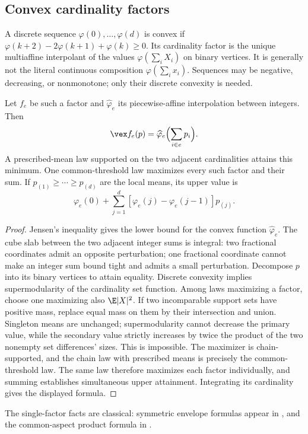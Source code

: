 \subsection{Convex cardinality factors}
A discrete sequence $\varphi(0),\ldots,\varphi(d)$ is convex if
$\varphi(k+2)-2\varphi(k+1)+\varphi(k)\ge0$. Its cardinality factor
is the unique multiaffine interpolant of the values
$\varphi(\sum_iX_i)$ on binary vertices. It is generally not the literal
continuous composition $\varphi(\sum_ix_i)$. Sequences may be negative,
decreasing, or nonmonotone; only their discrete convexity is needed.

\begin{lemma}\label{lem:cardinality-envelopes}
Let $f_e$ be such a factor and $\widehat\varphi_e$ its piecewise-affine
interpolation between integers. Then
\[
 \vex f_e(p)=\widehat\varphi_e\Bigl(\sum_{i\in e}p_i\Bigr).
\]
A prescribed-mean law supported on the two adjacent cardinalities attains
this minimum. One common-threshold law maximizes every such factor and
their sum. If $p_{(1)}\ge\cdots\ge p_{(d)}$ are the local means, its
upper value is
\[
 \varphi_e(0)+\sum_{j=1}^d[\varphi_e(j)-\varphi_e(j-1)]p_{(j)}.
\]
\end{lemma}
\begin{proof}
Jensen's inequality gives the lower bound for the convex function
$\widehat\varphi_e$. The cube slab between the two adjacent integer
sums is integral: two fractional coordinates admit an opposite
perturbation; one fractional coordinate cannot make an integer sum
bound tight and admits a small perturbation. Decompose $p$ into its
binary vertices to attain equality.
Discrete convexity implies supermodularity of the cardinality set
function. Among laws maximizing a factor, choose one maximizing also
$\E|X|^2$. If two incomparable support sets have positive mass, replace
equal mass on them by their intersection and union. Singleton means
are unchanged; supermodularity cannot decrease the primary value,
while the secondary value strictly increases by twice the product of
the two nonempty set differences' sizes. This is impossible. The
maximizer is chain-supported, and the chain law with prescribed means
is precisely the common-threshold law. The same law therefore maximizes
each factor individually, and summing establishes simultaneous upper
attainment. Integrating its cardinality gives the displayed formula.
\end{proof}
The single-factor facts are classical: symmetric envelope formulas appear
in \citet{Sherali1997}, and the common-aspect product formula in
\citet[Proposition 4.1]{AdamsGupteXu2019}.


